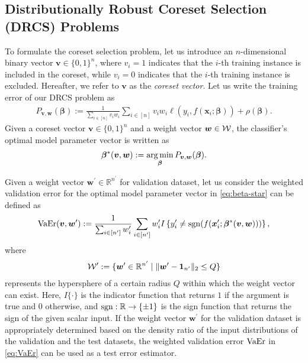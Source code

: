 
\subsection{Distributionally Robust Coreset Selection (DRCS) Problems}
%
To formulate the coreset selection problem, let us introduce an $ n $-dimensional binary vector $ \bm v \in \{0, 1\}^n $, where $ v_i = 1 $ indicates that the $ i $-th training instance is included in the coreset, while $ v_i = 0 $ indicates that the $ i $-th training instance is excluded.  
%
Hereafter, we refer to $ \bm v $ as the \emph{coreset vector}.  
%
Let us write the training error of our DRCS problem as
\begin{align}
\label{eq:primal}
P_{\bm v, \bm w}(\bm \beta)
:=
\frac{1}{\sum_{i \in [n]} v_i w_i}
\sum_{i \in [n]}
v_i
w_i
\ell
\left(
y_i, f(\bm x_i; \bm \beta)
\right)
+
\rho(\bm \beta). 
\end{align}
%
Given a coreset vector $\bm v \in \{0, 1\}^n$ and a weight vector $\bm w \in {\mathcal W}$, the classifier's optimal model parameter vector is written as
\begin{align}
 \label{eq:beta-star}
 \bm \beta^*(\bm v, \bm w)
 :=
 \operatorname*{arg\,min}_{\bm \beta}
 P_{\bm v, \bm w}(\bm \beta).
\end{align}

Given a weight vector $\bm{w}^\prime \in \mathbb{R}^{n^\prime}$ for validation dataset, let us consider the weighted validation error for the optimal model parameter vector in \eqref{eq:beta-star} can be defined as  
\begin{align}
\label{eq:VaEr}
{\rm VaEr}(\bm{v}, \bm{w}^\prime) 
:= 
\frac{1}{\sum_{i \in [n^\prime]} w_i^\prime} 
\sum_{i \in [n^\prime]} 
w_i^\prime 
I 
\left\{ 
y_i^\prime \neq {\rm sgn}(f(\bm{x}_i^\prime; \bm{\beta}^*(\bm{v}, \bm{w}))) 
\right\},
\end{align}
where  
\begin{align}  
{\mathcal W}^\prime := \{\bm{w}^\prime \in \mathbb{R}^{n^\prime} \mid \| \bm{w}^\prime - \bm{1}_{n^\prime} \|_2 \le Q\}  
\end{align}  
represents the hypersphere of a certain radius $Q$ within which the weight vector can exist.
%
Here, $I\{\cdot\}$ is the indicator function that returns $1$ if the argument is true and $0$ otherwise, and ${\rm sgn}: \mathbb{R} \to \{\pm 1\}$ is the sign function that returns the sign of the given scalar input. 
%
If the weight vector $\bm w^\prime$ for the validation dataset is appropriately determined based on the density ratio of the input distributions of the validation and the test datasets, the weighted validation error ${\rm VaEr}$ in \eqref{eq:VaEr} can be used as a test error estimator.

